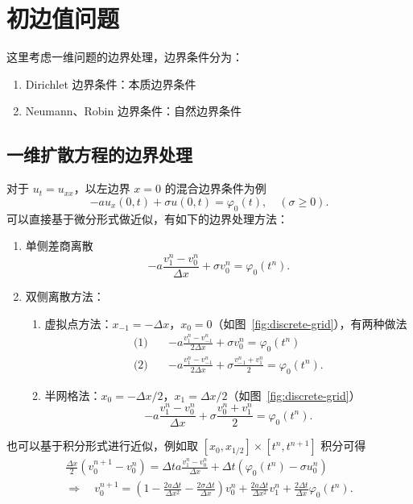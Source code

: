 \chapter{初边值问题}

这里考虑一维问题的边界处理，边界条件分为：
\begin{enumerate}
    \item Dirichlet 边界条件：本质边界条件
    \item Neumann、Robin 边界条件：自然边界条件
\end{enumerate}

\section{一维扩散方程的边界处理}

对于 $u_t =  u_{xx}$，以左边界 $x=0$ 的混合边界条件为例
\[
    - a u_x(0,t) + \sigma u(0,t) = \varphi_0(t),\quad (\sigma \ge 0).
\]
可以直接基于微分形式做近似，有如下的边界处理方法：
\begin{enumerate}
    \item 单侧差商离散
          \[
              -a \frac{v_1^n - v_0^n}{\Delta x} + \sigma v_0^n = \varphi_0(t^n).
          \]
    \item 双侧离散方法：
          \begin{enumerate}
              \item 虚拟点方法：$x_{-1} = - \Delta x$，$x_0 = 0$（如图~\ref{fig:discrete-grid}），有两种做法
                    \begin{align*}
                        \text{(1)} \quad & -a \frac{v_1^n - v_{-1}^n}{2\Delta x} + \sigma v_0^n = \varphi_0(t^n)
                        \\
                        \text{(2)} \quad & -a \frac{v_1^n - v_{-1}^n}{2\Delta x} + \sigma \frac{v_{-1}^n + v_1^n }2  = \varphi_0(t^n).
                    \end{align*}
              \item 半网格法：$x_0 = -{\Delta x}/2$，$x_1 = {\Delta x}/2$（如图~\ref{fig:discrete-grid}）
                    \[
                        -a \frac{v_1^n - v_{0}^n}{\Delta x} + \sigma \frac{v_0^n + v_1^n}2 = \varphi_0(t^n).
                    \]
          \end{enumerate}
\end{enumerate}
也可以基于积分形式进行近似，例如取 $[x_0,x_{1/2}] \times [t^n,t^{n+1}]$ 积分可得
\begin{gather*}
    \frac{\Delta x}2 (v_0^{n+1} - v_0^n)
    = \Delta t a \frac{v_1^n - v_0^n}{\Delta x} + \Delta t (\varphi_0(t^n) - \sigma u_0^n)
    \\
    \Rightarrow \quad  v_0^{n+1} = \left(1 - \frac{2 a \Delta t}{\Delta x^2} - \frac{2\sigma \Delta t}{\Delta x}\right) v_0^n
    + \frac{2 a \Delta t}{\Delta x^2} v_1^n + \frac{2\Delta t}{\Delta x} \varphi_0(t^n).
\end{gather*}



